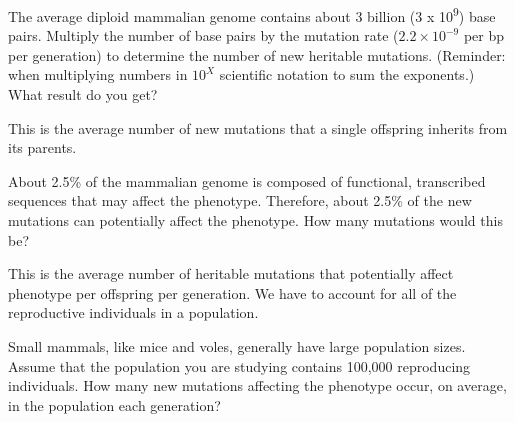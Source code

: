 \documentclass[11pt, addpoints, hidelinks]{exam}
\begin{document}
\begin{questions}

\question
\label{itm:kumar} The average diploid mammalian genome contains about 3
billion (3 x 10\textsuperscript{9}) base pairs. Multiply the number of
base pairs by the mutation rate ($2.2 \times 10^{-9}$ per bp per
generation) to determine the number of new heritable mutations.
(Reminder: when multiplying numbers in $10^X$ scientific
notation to sum the exponents.) What result do you get?%

\ifprintanswers{}
\else
\fi

This is the average number of new mutations that a single offspring
inherits from its parents.

\question
About 2.5\% of the mammalian genome is composed of
functional, transcribed sequences that may affect the phenotype.
Therefore, about 2.5\% of the new mutations can potentially affect the
phenotype. How many mutations would this be?

\ifprintanswers\vspace*{\baselineskip}{\bfseries%
	$6.6 \times 0.025 = 0.165$ mutations may affect the phenotype.}
\else
\fi

This is the average number of heritable mutations that potentially
affect phenotype per offspring per generation. We have to account for
all of the reproductive individuals in a population.

\question 
Small mammals, like mice and voles, generally have large
population sizes. Assume that the population you are studying contains
100,000 reproducing individuals. How many new mutations affecting the phenotype occur, on
average, in the population each generation?

\ifprintanswers\vspace*{\baselineskip}{\bfseries%
	$100,000 \times 0.165 = 16,500$ new mutations per generation in the population.}
\else
\fi


\end{questions}
\end{document}
